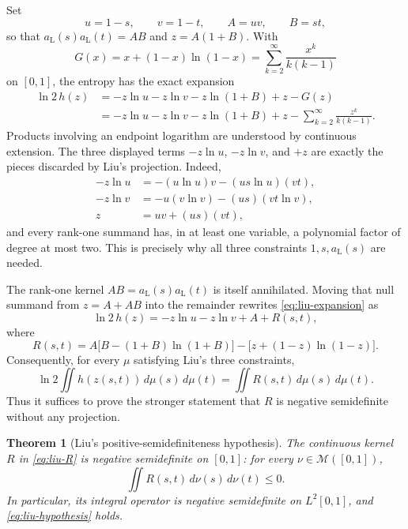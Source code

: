 \documentclass[11pt]{article}
\theoremstyle{plain}
\newtheorem{theorem}{Theorem}[section]
\theoremstyle{definition}
\theoremstyle{remark}
\newcommand{\MM}{\mathcal M}
\begin{document}
Set
\[
u=1-s,\qquad v=1-t,\qquad A=uv,\qquad B=st,
\]
so that $a_{\mathrm L}(s)a_{\mathrm L}(t)=AB$ and
$z=A(1+B)$.  With
\[
G(x)=x+(1-x)\ln(1-x)
     =\sum_{k=2}^{\infty}\frac{x^k}{k(k-1)}
\]
on $[0,1]$, the entropy has the exact expansion
\begin{equation}
\begin{aligned}
\ln2\,h(z)
 &=-z\ln u-z\ln v-z\ln(1+B)+z-G(z)\\
 &=-z\ln u-z\ln v-z\ln(1+B)+z
   -\sum_{k=2}^{\infty}\frac{z^k}{k(k-1)}.
\end{aligned}
\label{eq:liu-expansion}
\end{equation}
Products involving an endpoint logarithm are understood by continuous
extension.  The three displayed terms $-z\ln u$, $-z\ln v$, and $+z$ are
exactly the pieces discarded by Liu's projection.  Indeed,
\[
\begin{aligned}
-z\ln u&=-(u\ln u)v-(us\ln u)(vt),\\
-z\ln v&=-u(v\ln v)-(us)(vt\ln v),\\
z&=uv+(us)(vt),
\end{aligned}
\]
and every rank-one summand has, in at least one variable, a polynomial factor
of degree at most two.  This is precisely why all three constraints
$1,s,a_{\mathrm L}(s)$ are needed.

The rank-one kernel $AB=a_{\mathrm L}(s)a_{\mathrm L}(t)$ is itself
annihilated.  Moving that null summand from $z=A+AB$ into the remainder rewrites
\eqref{eq:liu-expansion} as
\[
\ln2\,h(z)=-z\ln u-z\ln v+A+R(s,t),
\]
where
\begin{equation}
R(s,t)
=A\bigl[B-(1+B)\ln(1+B)\bigr]
 -\bigl[z+(1-z)\ln(1-z)\bigr].
\label{eq:liu-R}
\end{equation}
Consequently, for every $\mu$ satisfying Liu's three constraints,
\begin{equation}
\ln2\iint h(z(s,t))\,d\mu(s)\,d\mu(t)
=\iint R(s,t)\,d\mu(s)\,d\mu(t).
\label{eq:liu-reduction}
\end{equation}
Thus it suffices to prove the stronger statement that $R$ is negative
semidefinite without any projection.

\begin{theorem}[Liu's positive-semidefiniteness hypothesis]
\label{thm:liu-psd}
The continuous kernel $R$ in \eqref{eq:liu-R} is negative semidefinite on
$[0,1]$: for every $\nu\in\MM([0,1])$,
\[
\iint R(s,t)\,d\nu(s)\,d\nu(t)\le0.
\]
In particular, its integral operator is negative semidefinite on
$L^2[0,1]$, and \eqref{eq:liu-hypothesis} holds.
\end{theorem}
\end{document}
